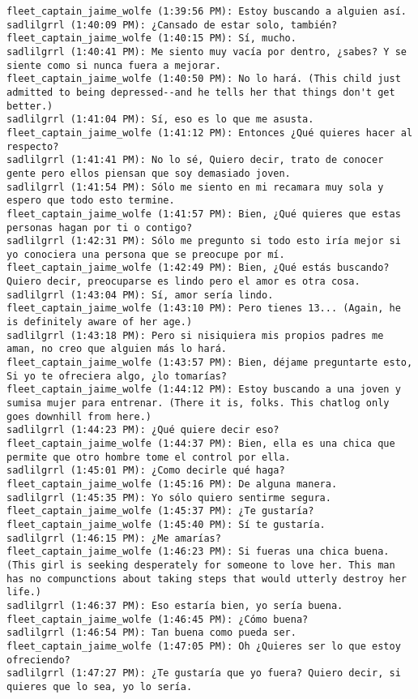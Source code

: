 \begin{verbatim}
fleet_captain_jaime_wolfe (1:39:56 PM): Estoy buscando a alguien así. 
sadlilgrrl (1:40:09 PM): ¿Cansado de estar solo, también?
fleet_captain_jaime_wolfe (1:40:15 PM): Sí, mucho.
sadlilgrrl (1:40:41 PM): Me siento muy vacía por dentro, ¿sabes? Y se siente como si nunca fuera a mejorar.
fleet_captain_jaime_wolfe (1:40:50 PM): No lo hará. (This child just admitted to being depressed--and he tells her that things don't get better.)
sadlilgrrl (1:41:04 PM): Sí, eso es lo que me asusta.
fleet_captain_jaime_wolfe (1:41:12 PM): Entonces ¿Qué quieres hacer al respecto?
sadlilgrrl (1:41:41 PM): No lo sé, Quiero decir, trato de conocer gente pero ellos piensan que soy demasiado joven.
sadlilgrrl (1:41:54 PM): Sólo me siento en mi recamara muy sola y espero que todo esto termine.
fleet_captain_jaime_wolfe (1:41:57 PM): Bien, ¿Qué quieres que estas personas hagan por ti o contigo?
sadlilgrrl (1:42:31 PM): Sólo me pregunto si todo esto iría mejor si yo conociera una persona que se preocupe por mí.
fleet_captain_jaime_wolfe (1:42:49 PM): Bien, ¿Qué estás buscando? Quiero decir, preocuparse es lindo pero el amor es otra cosa.
sadlilgrrl (1:43:04 PM): Sí, amor sería lindo.
fleet_captain_jaime_wolfe (1:43:10 PM): Pero tienes 13... (Again, he is definitely aware of her age.)
sadlilgrrl (1:43:18 PM): Pero si nisiquiera mis propios padres me aman, no creo que alguien más lo hará.
fleet_captain_jaime_wolfe (1:43:57 PM): Bien, déjame preguntarte esto, Si yo te ofreciera algo, ¿lo tomarías?
fleet_captain_jaime_wolfe (1:44:12 PM): Estoy buscando a una joven y sumisa mujer para entrenar. (There it is, folks. This chatlog only goes downhill from here.)
sadlilgrrl (1:44:23 PM): ¿Qué quiere decir eso?
fleet_captain_jaime_wolfe (1:44:37 PM): Bien, ella es una chica que permite que otro hombre tome el control por ella.
sadlilgrrl (1:45:01 PM): ¿Como decirle qué haga?
fleet_captain_jaime_wolfe (1:45:16 PM): De alguna manera.
sadlilgrrl (1:45:35 PM): Yo sólo quiero sentirme segura.
fleet_captain_jaime_wolfe (1:45:37 PM): ¿Te gustaría?
fleet_captain_jaime_wolfe (1:45:40 PM): Sí te gustaría.
sadlilgrrl (1:46:15 PM): ¿Me amarías?
fleet_captain_jaime_wolfe (1:46:23 PM): Si fueras una chica buena. (This girl is seeking desperately for someone to love her. This man has no compunctions about taking steps that would utterly destroy her life.)
sadlilgrrl (1:46:37 PM): Eso estaría bien, yo sería buena.
fleet_captain_jaime_wolfe (1:46:45 PM): ¿Cómo buena?
sadlilgrrl (1:46:54 PM): Tan buena como pueda ser.
fleet_captain_jaime_wolfe (1:47:05 PM): Oh ¿Quieres ser lo que estoy ofreciendo?
sadlilgrrl (1:47:27 PM): ¿Te gustaría que yo fuera? Quiero decir, si quieres que lo sea, yo lo sería.

\end{verbatim}

